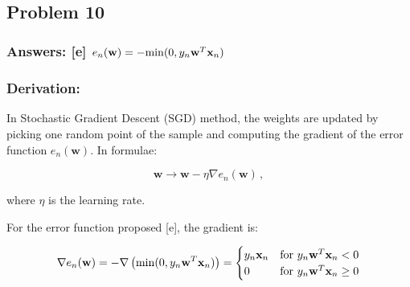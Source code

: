 \documentclass[11pt]{article}
\begin{document}
    \begin{center}
    \end{center}
    { \hspace*{\fill} \\}
    
    \hypertarget{problem-10}{%
\subsection{Problem 10}\label{problem-10}}

\hypertarget{answers-e-e_nmathbfw-rm-min0y_nmathbfwtmathbfx_n}{%
\subsubsection{\texorpdfstring{Answers: {[}e{]}
\(e_n(\mathbf{w})=-{\rm min}(0,y_n\mathbf{w}^T\mathbf{x}_n)\)}{Answers: {[}e{]} e\_n(\textbackslash{}mathbf\{w\})=-\{\textbackslash{}rm min\}(0,y\_n\textbackslash{}mathbf\{w\}\^{}T\textbackslash{}mathbf\{x\}\_n)}}\label{answers-e-e_nmathbfw-rm-min0y_nmathbfwtmathbfx_n}}

\hypertarget{derivation}{%
\subsubsection{Derivation:}\label{derivation}}

In Stochastic Gradient Descent (SGD) method, the weights are updated by
picking one random point of the sample and computing the gradient of the
error function \(e_n(\mathbf{w})\). In formulae:

\begin{equation}
\mathbf{w}\rightarrow \mathbf{w}-\eta \nabla e_n(\mathbf{w})\,,
\end{equation}

where \(\eta\) is the learning rate.

For the error function proposed {[}e{]}, the gradient is:

\begin{equation}
 \nabla e_n(\mathbf{w})= -\nabla \left({\rm min}(0,y_n\mathbf{w}^T\mathbf{x}_n)\right)=
\begin{cases}
y_n\mathbf{x}_n & \text{for } y_n\mathbf{w}^T\mathbf{x}_n < 0\\
0  & \text{for } y_n\mathbf{w}^T\mathbf{x}_n \ge 0
\end{cases}
\end{equation}
\end{document}
